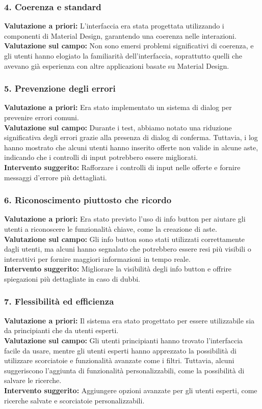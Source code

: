 \subsubsection{4. Coerenza e standard}
\textbf{Valutazione a priori:} L'interfaccia era stata progettata utilizzando i componenti di Material Design, garantendo una coerenza nelle interazioni.\\
\textbf{Valutazione sul campo:} Non sono emersi problemi significativi di coerenza, e gli utenti hanno elogiato la familiarità dell'interfaccia, soprattutto quelli che avevano già esperienza con altre applicazioni basate su Material Design.

\subsubsection{5. Prevenzione degli errori}
\textbf{Valutazione a priori:} Era stato implementato un sistema di dialog per prevenire errori comuni.\\
\textbf{Valutazione sul campo:} Durante i test, abbiamo notato una riduzione significativa degli errori grazie alla presenza di dialog di conferma. Tuttavia, i log hanno mostrato che alcuni utenti hanno inserito offerte non valide in alcune aste, indicando che i controlli di input potrebbero essere migliorati.\\
\textbf{Intervento suggerito:} Rafforzare i controlli di input nelle offerte e fornire messaggi d’errore più dettagliati.

\subsubsection{6. Riconoscimento piuttosto che ricordo}
\textbf{Valutazione a priori:} Era stato previsto l'uso di info button per aiutare gli utenti a riconoscere le funzionalità chiave, come la creazione di aste.\\
\textbf{Valutazione sul campo:} Gli info button sono stati utilizzati correttamente dagli utenti, ma alcuni hanno segnalato che potrebbero essere resi più visibili o interattivi per fornire maggiori informazioni in tempo reale.\\
\textbf{Intervento suggerito:} Migliorare la visibilità degli info button e offrire spiegazioni più dettagliate in caso di dubbi.

\subsubsection{7. Flessibilità ed efficienza}
\textbf{Valutazione a priori:} Il sistema era stato progettato per essere utilizzabile sia da principianti che da utenti esperti.\\
\textbf{Valutazione sul campo:} Gli utenti principianti hanno trovato l'interfaccia facile da usare, mentre gli utenti esperti hanno apprezzato la possibilità di utilizzare scorciatoie e funzionalità avanzate come i filtri. Tuttavia, alcuni suggeriscono l'aggiunta di funzionalità personalizzabili, come la possibilità di salvare le ricerche.\\
\textbf{Intervento suggerito:} Aggiungere opzioni avanzate per gli utenti esperti, come ricerche salvate e scorciatoie personalizzabili.

